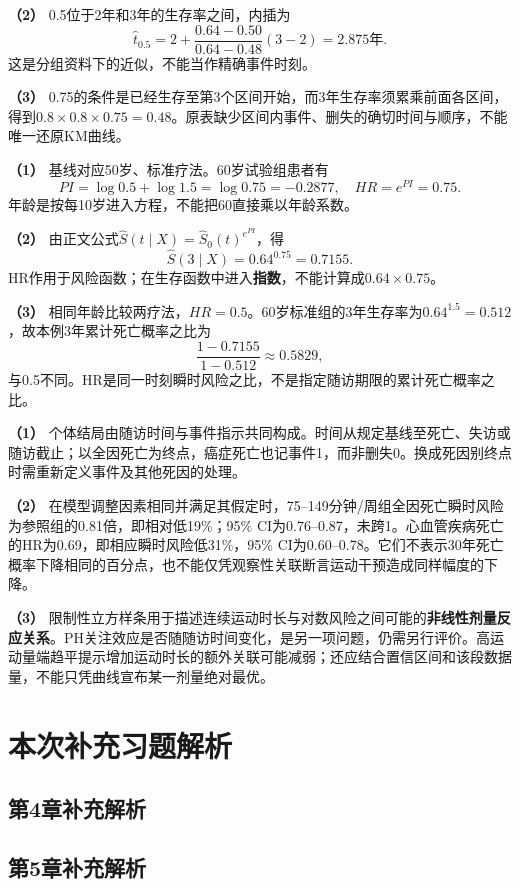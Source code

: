 \textbf{（2）} 0.5位于2年和3年的生存率之间，内插为
\[\hat t_{0.5}=2+\frac{0.64-0.50}{0.64-0.48}(3-2)=2.875\text{年}.\]
这是分组资料下的近似，不能当作精确事件时刻。

\textbf{（3）} 0.75的条件是已经生存至第3个区间开始，而3年生存率须累乘前面各区间，得到\(0.8\times0.8\times0.75=0.48\)。原表缺少区间内事件、删失的确切时间与顺序，不能唯一还原KM曲线。




\textbf{（1）} 基线对应50岁、标准疗法。60岁试验组患者有
\[PI=\log0.5+\log1.5=\log0.75=-0.2877,\quad HR=e^{PI}=0.75.\]
年龄是按每10岁进入方程，不能把60直接乘以年龄系数。

\textbf{（2）} 由正文公式\(\hat S(t\mid X)=\hat S_0(t)^{e^{PI}}\)，得
\[\hat S(3\mid X)=0.64^{0.75}=0.7155.\]
HR作用于风险函数；在生存函数中进入\textbf{指数}，不能计算成\(0.64\times0.75\)。

\textbf{（3）} 相同年龄比较两疗法，\(HR=0.5\)。60岁标准组的3年生存率为\(0.64^{1.5}=0.512\)，故本例3年累计死亡概率之比为
\[\frac{1-0.7155}{1-0.512}\approx0.5829,\]
与0.5不同。HR是同一时刻瞬时风险之比，不是指定随访期限的累计死亡概率之比。




\textbf{（1）} 个体结局由随访时间与事件指示共同构成。时间从规定基线至死亡、失访或随访截止；以全因死亡为终点，癌症死亡也记事件1，而非删失0。换成死因别终点时需重新定义事件及其他死因的处理。

\textbf{（2）} 在模型调整因素相同并满足其假定时，75--149分钟/周组全因死亡瞬时风险为参照组的0.81倍，即相对低19\%；95\% CI为0.76--0.87，未跨1。心血管疾病死亡的HR为0.69，即相应瞬时风险低31\%，95\% CI为0.60--0.78。它们不表示30年死亡概率下降相同的百分点，也不能仅凭观察性关联断言运动干预造成同样幅度的下降。

\textbf{（3）} 限制性立方样条用于描述连续运动时长与对数风险之间可能的\textbf{非线性剂量反应关系}。PH关注效应是否随随访时间变化，是另一项问题，仍需另行评价。高运动量端趋平提示增加运动时长的额外关联可能减弱；还应结合置信区间和该段数据量，不能只凭曲线宣布某一剂量绝对最优。
\clearpage\section{本次补充习题解析}
\subsection*{第4章补充解析}

\subsection*{第5章补充解析}

\EndExercises
